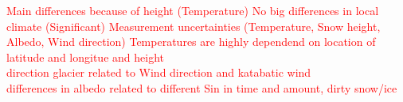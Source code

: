 \documentclass[11pt]{report}
\begin{document}
\textcolor{red}{
Main differences because of height (Temperature)
No big differences in local climate (Significant)
Measurement uncertainties (Temperature, Snow height, Albedo, Wind direction)
Temperatures are highly dependend on location of latitude and longitue and height\\
direction glacier related to Wind direction and katabatic wind\\
differences in albedo related to different Sin in time and amount, dirty snow/ice}


\medskip
\end{document}
